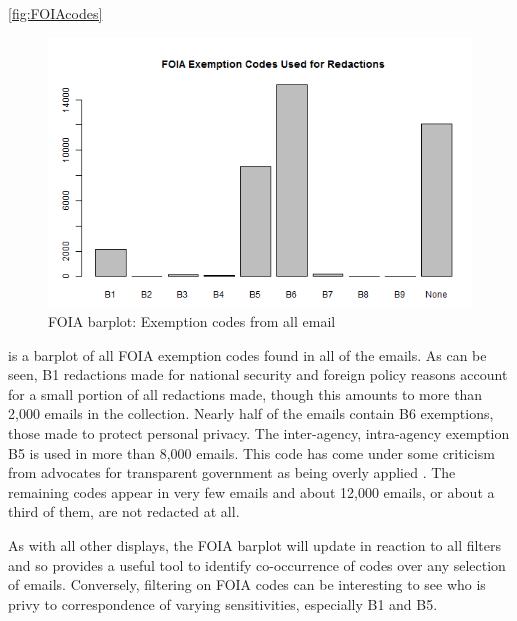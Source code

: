 \documentclass[journal]{vgtc}                %
\begin{document}
\autoref{fig:FOIAcodes}
\begin{figure}[h]
\begin{center}
\includegraphics[width=0.95\linewidth]{ExemptionsFullTime}
\caption{FOIA barplot: Exemption codes from all email}
\label{fig:FOIAcodes}
\end{center}
\end{figure}
is a barplot of all FOIA exemption codes found in all of the emails.  As can be seen, B1 redactions made for national security and foreign policy reasons account for a small portion of all redactions made,  though this amounts to more than 2,000 emails in the collection.   Nearly half of the emails contain B6 exemptions, those made to protect personal privacy.   The inter-agency, intra-agency exemption B5 is used in more than 8,000 emails.  This code has come under some criticism from advocates for transparent government as being overly applied \cite{unredactedB5}.  The remaining codes appear in very few emails and about 12,000 emails, or about a third of them, are not redacted at all.

As with all other displays, the FOIA barplot will update in reaction to all filters and so provides a useful tool to identify co-occurrence of codes over any selection of emails.  Conversely, filtering on FOIA codes can be interesting to see who is privy to correspondence of varying sensitivities, especially B1 and B5.
\end{document}
